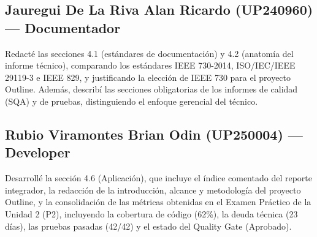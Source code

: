 \documentclass[12pt, letterpaper]{article}
\begin{document}
\subsection*{Jauregui De La Riva Alan Ricardo (UP240960) — Documentador}

Redacté las secciones 4.1 (estándares de documentación) y 4.2 (anatomía del informe técnico), comparando los estándares IEEE 730-2014, ISO/IEC/IEEE 29119-3 e IEEE 829, y justificando la elección de IEEE 730 para el proyecto Outline. Además, describí las secciones obligatorias de los informes de calidad (SQA) y de pruebas, distinguiendo el enfoque gerencial del técnico.

\subsection*{Rubio Viramontes Brian Odin (UP250004) — Developer}

Desarrollé la sección 4.6 (Aplicación), que incluye el índice comentado del reporte integrador, la redacción de la introducción, alcance y metodología del proyecto Outline, y la consolidación de las métricas obtenidas en el Examen Práctico de la Unidad 2 (P2), incluyendo la cobertura de código (62\%), la deuda técnica (23 días), las pruebas pasadas (42/42) y el estado del Quality Gate (Aprobado).

\newpage
\printbibliography[title={Referencias}]
\end{document}

